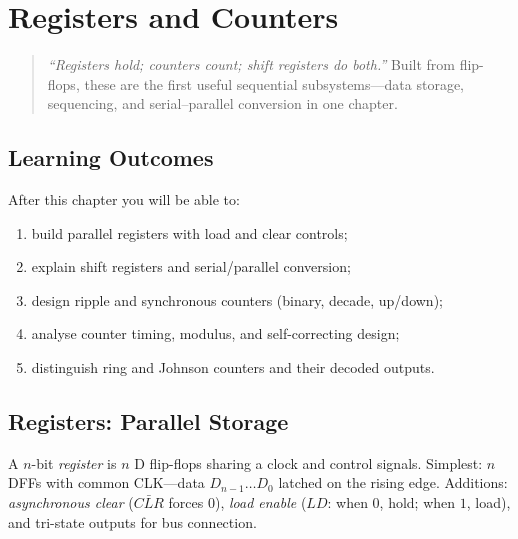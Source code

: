 \chapter{Registers and Counters}
\label{ch:registers}

\begin{quote}
\emph{``Registers hold; counters count; shift registers do both.''}
Built from flip-flops, these are the first useful sequential subsystems---data
storage, sequencing, and serial--parallel conversion in one chapter.
\end{quote}

\noindent{}
\vspace{0.4em}

\section*{Learning Outcomes}
After this chapter you will be able to:
\begin{enumerate}[label=(L\arabic*)]
    \item build parallel registers with load and clear controls;
    \item explain shift registers and serial/parallel conversion;
    \item design ripple and synchronous counters (binary, decade, up/down);
    \item analyse counter timing, modulus, and self-correcting design;
    \item distinguish ring and Johnson counters and their decoded outputs.
\end{enumerate}

\section{Registers: Parallel Storage}
\label{sec:registers}
A $n$-bit \emph{register} is $n$ D flip-flops sharing a clock and control signals.
Simplest: $n$ DFFs with common CLK---data $D_{n-1}\dots D_0$ latched on the rising edge.
Additions: \emph{asynchronous clear} ($\bar{CLR}$ forces $0$), \emph{load enable} ($LD$: when $0$, hold; when $1$, load), and tri-state outputs for bus connection.

